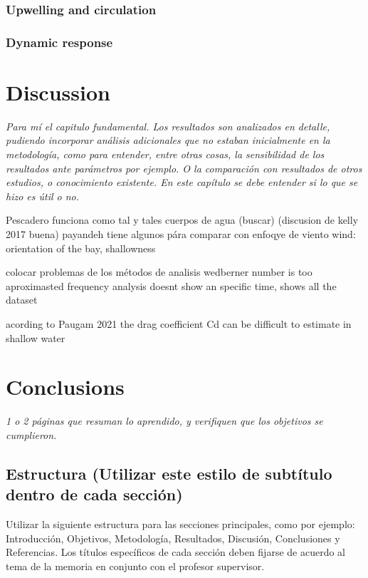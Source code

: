 \documentclass[11pt,letterpaper]{article}
\begin{document}
\subsubsection{Upwelling and circulation}

\subsubsection{Dynamic response}



\section{Discussion}

\textit{Para mí el capitulo fundamental. Los resultados son analizados en detalle, pudiendo incorporar análisis adicionales que no estaban inicialmente en la metodología, como para entender, entre otras cosas, la sensibilidad de los resultados ante parámetros por ejemplo. O la comparación con resultados de otros estudios, o conocimiento existente. En este capítulo se debe entender si lo que se hizo es útil o no.}

Pescadero funciona como tal y tales cuerpos de agua (buscar) (discusion de kelly 2017 buena)
payandeh tiene algunos pára comparar con enfoqye de viento
wind: orientation of the bay, shallowness

colocar problemas de los métodos de analisis
wedberner number is too aproximasted
frequency analysis doesnt show an specific time, shows all the dataset

acording to Paugam 2021 the drag coefficient Cd can be difficult to estimate in shallow water %

\section{Conclusions}

\textit{1 o 2 páginas que resuman lo aprendido, y verifiquen que los objetivos se cumplieron.}

\subsection{Estructura (Utilizar este estilo de subtítulo dentro de cada sección)}
Utilizar la siguiente estructura para las secciones principales, como por ejemplo: Introducción, Objetivos, Metodología, Resultados, Discusión, Conclusiones y Referencias. Los títulos específicos de cada sección deben fijarse de acuerdo al tema de la memoria en conjunto con el profesor supervisor.\\
\end{document}
